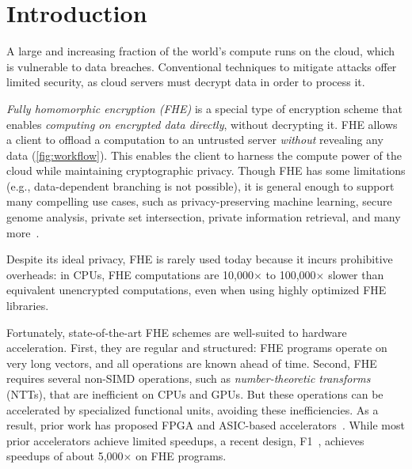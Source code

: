 \section{Introduction}\label{sec:intro}

A large and increasing fraction of the world's compute runs on the cloud,
which is vulnerable to data breaches.
Conventional techniques to mitigate attacks offer limited 
security, as cloud servers must decrypt data in order to process it.

\emph{Fully homomorphic encryption (FHE)} is a special type of encryption scheme
that enables \emph{computing on encrypted data directly}, without decrypting it.
FHE allows a client to offload a computation
to an untrusted server \emph{without} revealing any data (\autoref{fig:workflow}).
This enables the client to harness the compute power of the cloud while maintaining cryptographic privacy.
Though FHE has some limitations (e.g., data-dependent branching is not possible), 
it is general enough to support many compelling use cases,
such as privacy-preserving machine learning, secure genome analysis, private set intersection,
private information retrieval, and many more~\cite{kim2020semi,gilad:icml16:cryptonets,han:aaai19:logistic,han:iacr18:efficient,juvekar2018gazelle,DBLP:conf/ccs/ChenLR17,DBLP:conf/tcc/GentryH19}. 

Despite its ideal privacy, FHE is rarely used today because it incurs prohibitive overheads:
in CPUs, FHE computations are 10,000$\times$ to 100,000$\times$
slower than equivalent unencrypted computations, even when using highly optimized FHE libraries.

Fortunately, state-of-the-art FHE schemes are well-suited to hardware acceleration.
First, they are regular and structured:
FHE programs operate on very long vectors, and all operations are known ahead of time.
Second, FHE requires several non-SIMD operations,
such as \emph{number-theoretic transforms} (NTTs),
that are inefficient on CPUs and GPUs.
But these operations can be accelerated by specialized functional units,
avoiding these inefficiencies.
As a result, prior work has proposed FPGA and ASIC-based
accelerators~\cite{riazi:asplos20:heax,cousins:hpec12:sipher-fpga,cousins:tetc17:fpga-he,turan:tc20:heaws,cousins:hpec14:fpga-he, roy:hpca19:fpga-he,feldmann:micro21:f1}.
While most prior accelerators achieve limited speedups, a recent design,
F1~\cite{feldmann:micro21:f1}, achieves speedups of
about 5,000$\times$
on FHE programs.

